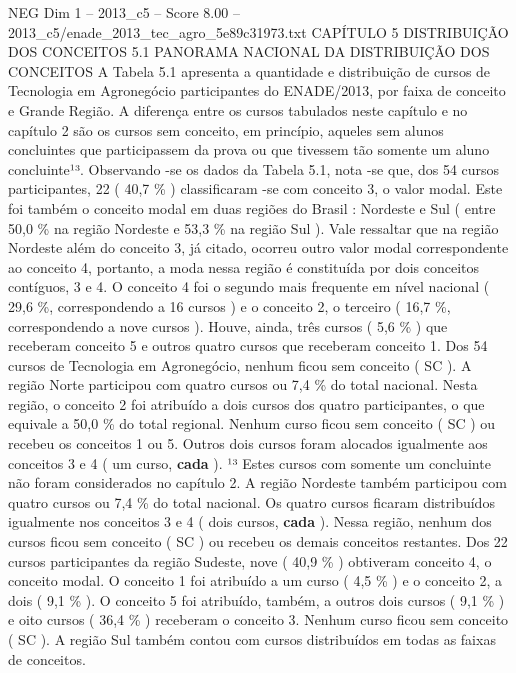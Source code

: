 \begin{textsample}{NEG Dim 1 – 2013\_c5 – Score 8.00 – 2013\_c5/enade\_2013\_tec\_agro\_5e89c31973.txt}  \label{ex:f1_neg_355}
CAPÍTULO 5 DISTRIBUIÇÃO DOS CONCEITOS 5.1 PANORAMA NACIONAL DA DISTRIBUIÇÃO DOS CONCEITOS A Tabela 5.1 apresenta a quantidade e distribuição de cursos de Tecnologia em Agronegócio participantes do ENADE/2013, por faixa de conceito e Grande Região.
A diferença entre os cursos tabulados neste capítulo e no capítulo 2 são os cursos sem conceito, em princípio, aqueles sem alunos concluintes que participassem da prova ou que tivessem tão somente um aluno concluinte¹³.
Observando -se os dados da Tabela 5.1, nota -se que, dos 54 cursos participantes, 22 ( 40,7 \% ) classificaram -se com conceito 3, o valor modal.
Este foi também o conceito modal em duas regiões do Brasil : Nordeste e Sul ( entre 50,0 \% na região Nordeste e 53,3 \% na região Sul ).
Vale ressaltar que na região Nordeste além do conceito 3, já citado, ocorreu outro valor modal correspondente ao conceito 4, portanto, a moda nessa região é constituída por dois conceitos contíguos, 3 e 4.
O conceito 4 foi o segundo mais frequente em nível nacional ( 29,6 \%, correspondendo a 16 cursos ) e o conceito 2, o terceiro ( 16,7 \%, correspondendo a nove cursos ).
Houve, ainda, três cursos ( 5,6 \% ) que receberam conceito 5 e outros quatro cursos que receberam conceito 1.
Dos 54 cursos de Tecnologia em Agronegócio, nenhum ficou sem conceito ( SC ).
A região Norte participou com quatro cursos ou 7,4 \% do total nacional.
Nesta região, o conceito 2 foi atribuído a dois cursos dos quatro participantes, o que equivale a 50,0 \% do total regional.
Nenhum curso ficou sem conceito ( SC ) ou recebeu os conceitos 1 ou 5.
Outros dois cursos foram alocados igualmente aos conceitos 3 e 4 ( um curso, \textbf{cada} ). ¹³ Estes cursos com somente um concluinte não foram considerados no capítulo 2.
A região Nordeste também participou com quatro cursos ou 7,4 \% do total nacional.
Os quatro cursos ficaram distribuídos igualmente nos conceitos 3 e 4 ( dois cursos, \textbf{cada} ).
Nessa região, nenhum dos cursos ficou sem conceito ( SC ) ou recebeu os demais conceitos restantes.
Dos 22 cursos participantes da região Sudeste, nove ( 40,9 \% ) obtiveram conceito 4, o conceito modal.
O conceito 1 foi atribuído a um curso ( 4,5 \% ) e o conceito 2, a dois ( 9,1 \% ).
O conceito 5 foi atribuído, também, a outros dois cursos ( 9,1 \% ) e oito cursos ( 36,4 \% ) receberam o conceito 3.
Nenhum curso ficou sem conceito ( SC ).
A região Sul também contou com cursos distribuídos em todas as faixas de conceitos.

\end{textsample}
